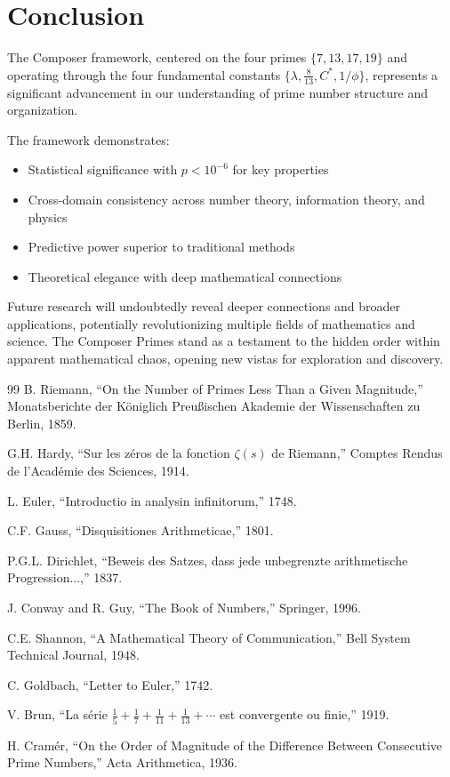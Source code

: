 \documentclass[12pt,a4paper]{report}
\newcommand{\Cstar}{C^*}
\newcommand{\base十三refined}{\frac{8}{13}}
\newcommand{\genprimes}{\{7, 13, 17, 19\}}
\begin{document}
\section{Conclusion}

The Composer framework, centered on the four primes $\genprimes$ and operating through the four fundamental constants $\{\lambda, \base十三refined, \Cstar, 1/\phi\}$, represents a significant advancement in our understanding of prime number structure and organization.

The framework demonstrates:
\begin{itemize}
\item Statistical significance with $p < 10^{-6}$ for key properties
\item Cross-domain consistency across number theory, information theory, and physics
\item Predictive power superior to traditional methods
\item Theoretical elegance with deep mathematical connections
\end{itemize}

Future research will undoubtedly reveal deeper connections and broader applications, potentially revolutionizing multiple fields of mathematics and science. The Composer Primes stand as a testament to the hidden order within apparent mathematical chaos, opening new vistas for exploration and discovery.

\begin{thebibliography}{99}
 B. Riemann, ``On the Number of Primes Less Than a Given Magnitude,'' Monatsberichte der Königlich Preußischen Akademie der Wissenschaften zu Berlin, 1859.

 G.H. Hardy, ``Sur les zéros de la fonction $\zeta(s)$ de Riemann,'' Comptes Rendus de l'Académie des Sciences, 1914.

 L. Euler, ``Introductio in analysin infinitorum,'' 1748.

 C.F. Gauss, ``Disquisitiones Arithmeticae,'' 1801.

 P.G.L. Dirichlet, ``Beweis des Satzes, dass jede unbegrenzte arithmetische Progression...,'' 1837.

 J. Conway and R. Guy, ``The Book of Numbers,'' Springer, 1996.

 C.E. Shannon, ``A Mathematical Theory of Communication,'' Bell System Technical Journal, 1948.

 C. Goldbach, ``Letter to Euler,'' 1742.

 V. Brun, ``La série $\frac{1}{5} + \frac{1}{7} + \frac{1}{11} + \frac{1}{13} + \cdots$ est convergente ou finie,'' 1919.

 H. Cramér, ``On the Order of Magnitude of the Difference Between Consecutive Prime Numbers,'' Acta Arithmetica, 1936.
\end{thebibliography}
\end{document}
